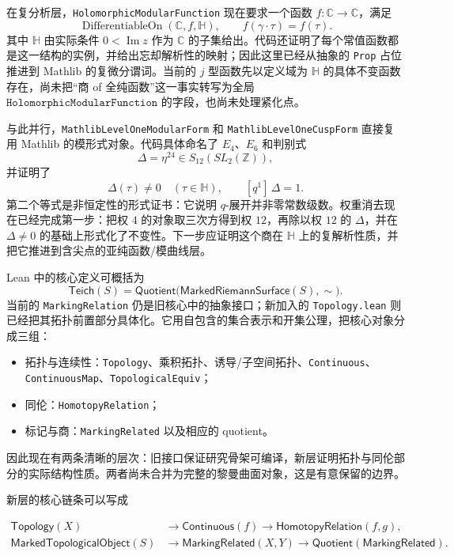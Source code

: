 \documentclass[UTF8,fontset=none,a4paper,11pt]{ctexart}
\begin{document}
在复分析层，\texttt{HolomorphicModularFunction} 现在要求一个函数
\(f:\mathbb C\to\mathbb C\)，满足
\[
  \operatorname{DifferentiableOn}(\mathbb C,f,\mathbb H),
  \qquad f(\gamma\cdot\tau)=f(\tau).
\]
其中 \(\mathbb H\) 由实际条件 \(0<\operatorname{Im}z\) 作为 \(\mathbb C\) 的子集给出。代码还证明了每个常值函数都是这一结构的实例，并给出忘却解析性的映射；因此这里已经从抽象的 \texttt{Prop} 占位推进到 Mathlib 的复微分谓词。当前的 $j$ 型函数先以定义域为 \(\mathbb H\) 的具体不变函数存在，尚未把“商 of 全纯函数”这一事实转写为全局 \(\texttt{HolomorphicModularFunction}\) 的字段，也尚未处理紧化点。

与此并行，\texttt{MathlibLevelOneModularForm} 和
\texttt{MathlibLevelOneCuspForm} 直接复用 Mathlib 的模形式对象。代码具体命名了
\(E_4\)、\(E_6\) 和判别式
\[
  \Delta=\eta^{24}\in S_{12}(SL_2(\mathbb Z)),
\]
并证明了
\[
  \Delta(\tau)\ne0\quad(\tau\in\mathbb H),\qquad
  [q^1]\,\Delta=1.
\]
第二个等式是非恒定性的形式证书：它说明 \(q\)-展开并非零常数级数。权重消去现在已经完成第一步：把权 \(4\) 的对象取三次方得到权 \(12\)，再除以权 \(12\) 的 \(\Delta\)，并在 \(\Delta\ne0\) 的基础上形式化了不变性。下一步应证明这个商在 \(\mathbb H\) 上的复解析性质，并把它推进到含尖点的亚纯函数/模曲线层。

Lean 中的核心定义可概括为
\[
  \mathsf{Teich}(S)=
  \mathsf{Quotient}\bigl(\mathsf{MarkedRiemannSurface}(S),\sim\bigr).
\]
当前的 \texttt{MarkingRelation} 仍是旧核心中的抽象接口；新加入的 \texttt{Topology.lean} 则已经把其拓扑前置部分具体化。它用自包含的集合表示和开集公理，把核心对象分成三组：

\begin{itemize}
  \item 拓扑与连续性：\texttt{Topology}、乘积拓扑、诱导/子空间拓扑、\texttt{Continuous}、\texttt{ContinuousMap}、\texttt{TopologicalEquiv}；
  \item 同伦：\texttt{HomotopyRelation}；
  \item 标记与商：\texttt{MarkingRelated} 以及相应的 quotient。
\end{itemize}

因此现在有两条清晰的层次：旧接口保证研究骨架可编译，新层证明拓扑与同伦部分的实际结构性质。两者尚未合并为完整的黎曼曲面对象，这是有意保留的边界。

新层的核心链条可以写成

\[
\begin{aligned}
\mathsf{Topology}(X)&\longrightarrow
\mathsf{Continuous}(f)\longrightarrow
\mathsf{HomotopyRelation}(f,g),\\
\mathsf{MarkedTopologicalObject}(S)&\longrightarrow
\mathsf{MarkingRelated}(X,Y)\longrightarrow
\mathsf{Quotient}(\mathsf{MarkingRelated}).
\end{aligned}
\]
\end{document}
